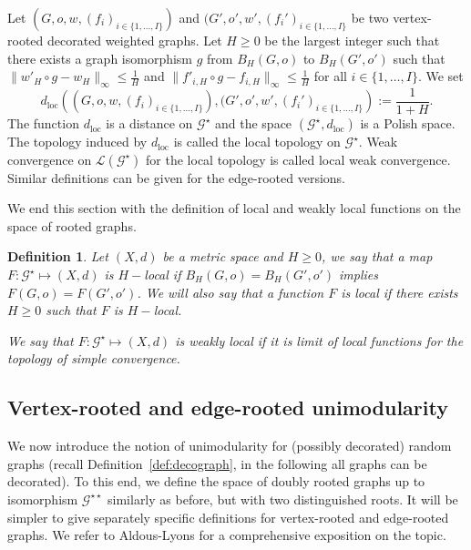 \documentclass[11pt]{article}
\newtheorem{definition}[prop]{Definition}
\begin{document}
Let $(G,o,w,(f_{i})_{i \in \{1,...,I\}})$ and $(G',o',w',(f_i')_{i \in \{1,...,I\}}$ be two vertex-rooted decorated weighted graphs. Let $H \geq 0$ be the largest integer such that there exists a graph isomorphism $g$ from  $B_H(G,o)$ to $ B_H (G',o')$ such that $\| w'_H\circ g - w_H \|_{\infty} \leq \frac{1}{H}$ and $\| f'_{i,H} \circ g - f_{i,H} \|_{\infty} \leq \frac{1}{H}$ for all $i \in \{1, \ldots , I \}$. We set
\begin{equation} \label{eq:dloc}
   d_{\mathrm{loc}} \left( (G,o,w,(f_{i})_{i \in \{1,...,I\}}) , (G',o',w',(f_i')_{i \in \{1,...,I\}} \right) := \frac{1}{1+H}.
\end{equation}
The function $ d_{\mathrm{loc}}$ is a distance on $\mathcal G^\star$ and the space $(\mathcal{G}^{\star},d_\mathrm
{loc})$ is a Polish space. The topology induced by  $ d_{\mathrm{loc}}$ is called the local topology on $\mathcal{G}^{\star}$. Weak convergence on $\mathcal{L}(\mathcal{G}^{\star})$ for the local topology is called local weak convergence.
Similar definitions can be given for the edge-rooted versions.

\bigskip

We end this section with the definition of local and weakly local functions on the space of rooted graphs.

\begin{definition}\label{def:locfunc}
    Let $(X,d)$ be a metric space and $H\geq0$, we say that a map $F:\mathcal{G}^{\star} \mapsto (X,d)$ is $H-$local if $B_H(G,o) = B_H(G',o')$ implies $F(G,o)=F(G',o')$. We will also say that a function $F$ is local if there exists $H\geq0$ such that $F$ is $H-$local.
    
    We say that $F:\mathcal{G}^{\star}\mapsto (X,d)$ is weakly local if it is limit of local functions for the topology of simple convergence.
\end{definition}

\subsection{Vertex-rooted and edge-rooted unimodularity}

We now introduce the notion of unimodularity for (possibly decorated) random graphs (recall Definition~\ref{def:decograph}, in the following all graphs can be decorated).
To this end, we define the space of doubly rooted graphs up to isomorphism $\mathcal{G}^{\star\star}$ similarly as before, but with two distinguished roots. It will be simpler to give separately specific definitions for vertex-rooted and edge-rooted graphs.
 We refer to Aldous-Lyons \cite{aldous2018processes} for a comprehensive exposition on the topic.
\end{document}
